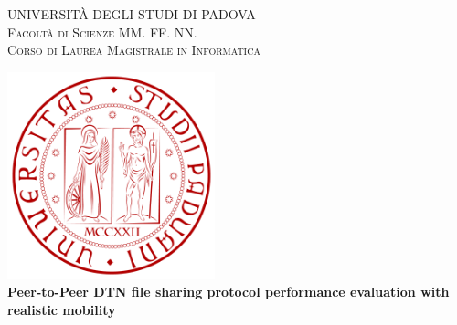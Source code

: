 
\begin{titlepage}
    \begin{center}
        {\Large UNIVERSITÀ DEGLI STUDI DI PADOVA}\\
        \vspace{0.2cm}                                                  %
        {\Large \scshape Facoltà di Scienze MM. FF. NN.}\\
        \vspace{2mm}
        {\Large \scshape Corso di Laurea Magistrale in Informatica}\\
        
        \vspace{2cm}
        
        \includegraphics[width=6cm]{figure/unipd_logo}\\
        
        
        \vspace{2cm}
        {\LARGE \bfseries Peer-to-Peer DTN file sharing protocol performance evaluation  with realistic mobility} \\
        \vspace{2.5cm}
    \end{center}


\end{titlepage}
